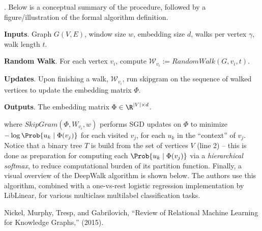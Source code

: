 \documentclass[11pt]{article}
\begin{document}
\myspace
\p {}. Below is a conceptual summary of the procedure, followed by a figure/illustration of the formal algorithm definition.
\begin{compactenum}
	\item \textbf{Inputs}. Graph $G(V, E)$, window size $w$, embedding size $d$, walks per vertex $\gamma$, walk length $t$. 
	
	\item \textbf{Random Walk}. For each vertex $v_i$, compute $\mathcal{W}_{v_i} := RandomWalk(G, v_i, t)$. 
	
	\item \textbf{Updates}. Upon finishing a walk, $\mathcal{W}_{v_i}$, run skipgram on the sequence of walked vertices to update the embedding matrix $\Phi$. 
	
	\item \textbf{Outputs}. The embedding matrix $\Phi \in \R^{|V| \times d}$. 
\end{compactenum}


where $SkipGram(\Phi, W_{v_i}, w)$ performs SGD updates on $\Phi$ to minimize $-\log\Prob{u_k \mid \Phi(v_j)}$ for each visited $v_j$, for each $u_k$ in the ``context'' of $v_j$. Notice that a binary tree $T$ is build from the set of vertices $V$ (line 2) -- this is done as preparation for computing each $\Prob{u_k \mid \Phi(v_j)}$ via a \textit{hierarchical softmax}, to reduce computational burden of its partition function. Finally, a visual overview of the DeepWalk algorithm is shown below.
The authors use this algorithm, combined with a one-vs-rest logistic regression implementation by LibLinear, for various multiclass multilabel classification tasks.  



\vspace{-1em}
{\footnotesize Nickel, Murphy, Tresp, and Gabrilovich, ``Review of Relational Machine Learning for Knowledge Graphs,'' (2015).}
\end{document}
